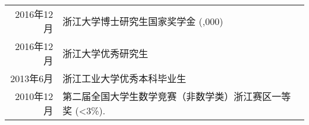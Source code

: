 %
%




\begin{tabular}{rl}	
	2016年12月 & 浙江大学博士研究生国家奖学金  (\textyen 30,000) \\
	2016年12月 & 浙江大学优秀研究生 \\
	2013年6月 & 浙江工业大学优秀本科毕业生 \\
	2010年12月 & 第二届全国大学生数学竞赛（非数学类）浙江赛区一等奖 (<3\%).	
\end{tabular}

